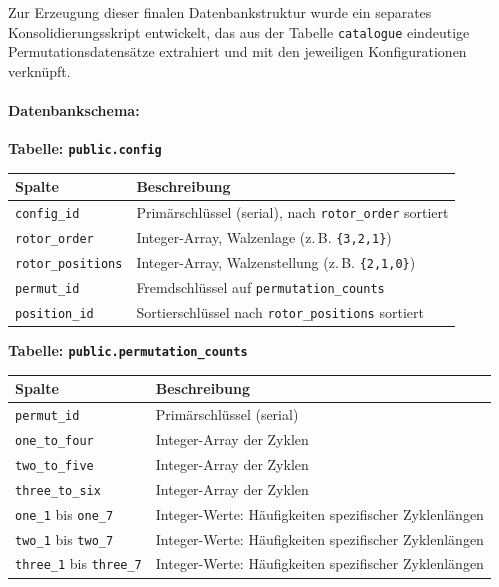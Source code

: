 \documentclass[12pt, ngerman, a4paper, numbers=noenddot]{article}
\begin{document}
Zur Erzeugung dieser finalen Datenbankstruktur wurde ein separates Konsolidierungsskript entwickelt, das aus der Tabelle \lstinline|catalogue| eindeutige Permutationsdatensätze extrahiert und mit den jeweiligen Konfigurationen verknüpft.
\paragraph{Datenbankschema:}
\begin{center}
	\textbf{Tabelle: \lstinline|public.config|}
	\begin{tabular}{ll}
		\toprule
		\textbf{Spalte} & \textbf{Beschreibung} \\
		\midrule
		\lstinline|config_id|       & Primärschlüssel (serial), nach \lstinline|rotor_order| sortiert\\
		\lstinline|rotor_order|     & Integer-Array, Walzenlage (z.\,B. \lstinline|{3,2,1}|) \\
		\lstinline|rotor_positions| & Integer-Array, Walzenstellung (z.\,B. \lstinline|{2,1,0}|) \\
		\lstinline|permut_id|       & Fremdschlüssel auf \lstinline|permutation_counts| \\
		\lstinline|position_id|     & Sortierschlüssel nach \lstinline|rotor_positions| sortiert\\
		\bottomrule
\end{tabular}


\end{center}
\begin{center}	
	\textbf{Tabelle: \lstinline|public.permutation_counts|}
	\begin{tabular}{ll}
		\toprule
		\textbf{Spalte} & \textbf{Beschreibung} \\
		\midrule
		\lstinline|permut_id|         & Primärschlüssel (serial) \\
		\lstinline|one_to_four|      & Integer-Array der Zyklen \\
		\lstinline|two_to_five|      & Integer-Array der Zyklen \\
		\lstinline|three_to_six|     & Integer-Array der Zyklen \\
		\lstinline|one_1| bis \lstinline|one_7| & Integer-Werte: Häufigkeiten spezifischer Zyklenlängen \\
		\lstinline|two_1| bis \lstinline|two_7| & Integer-Werte: Häufigkeiten spezifischer Zyklenlängen \\
		\lstinline|three_1| bis \lstinline|three_7| & Integer-Werte: Häufigkeiten spezifischer Zyklenlängen \\
		\bottomrule
	\end{tabular}
\end{center}
\end{document}
